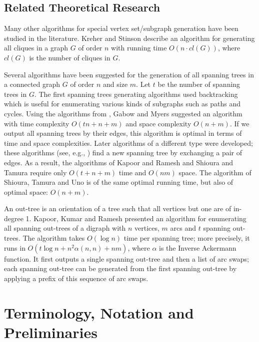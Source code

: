 \documentclass[11pt]{article}
\newcommand{\2}{\vspace{0.2 cm}}
\begin{document}
\subsection{ Related Theoretical Research}\label{rtrsec}

Many other algorithms for special vertex set/subgraph generation
have been studied in the literature. Kreher and Stinson
\cite{kreher} describe an algorithm for generating all cliques in a
graph $G$ of order $n$ with running time $O(n\cdot cl(G))$, where
$cl(G)$ is the number of cliques in $G.$

Several algorithms have been suggested for the generation of all spanning
trees in a connected graph $G$ of order $n$ and size $m$. Let $t$ be
the number of spanning trees in $G$. The first spanning trees
generating algorithms \cite{gabowSIAMJC7,mintyIEEETCT12,readN5} used
backtracking which is useful for enumerating various kinds of
subgraphs such as paths and cycles. Using the algorithms from
\cite{mintyIEEETCT12,readN5}, Gabow and Myers \cite{gabowSIAMJC7}
suggested an algorithm with time complexity $O(tn+n+m)$ and space
complexity $O(n+m)$. If we output all spanning trees by their edges,
this algorithm is optimal in terms of time and space complexities.
Later algorithms of a different type were developed; these algorithms
(see, e.g., \cite{kapoorSIAMJC24,shiouraJORSJ38,shiouraSIAMJC26})
find a new spanning tree by exchanging a pair of edges. As a result,
the algorithms of Kapoor and Ramesh \cite{kapoorSIAMJC24} and
Shioura and Tamura \cite{shiouraJORSJ38} require only $O(t+n+m)$
time and $O(nm)$ space. The algorithm of Shioura, Tamura and Uno
\cite{shiouraSIAMJC26} is of the same optimal running time, but also
of optimal space: $O(n+m).$



An out-tree is an orientation of a tree such that all vertices but
one are of in-degree 1. Kapoor, Kumar and Ramesh \cite{kapoorA27}
presented an algorithm for enumerating all spanning out-trees of a
digraph with $n$ vertices, $m$ arcs and $t$ spanning out-trees. The
algorithm takes $O(\log n )$ time per spanning tree; more precisely,
it runs in $O(t \log n +n^2\alpha(n,n)+nm)$, where $\alpha$ is the
Inverse Ackermann function. It first outputs a single spanning
out-tree and then a list of arc swaps; each spanning out-tree can be
generated from the first spanning out-tree by applying a prefix of
this sequence of arc swaps.



\section{Terminology, Notation and Preliminaries}
\end{document}
